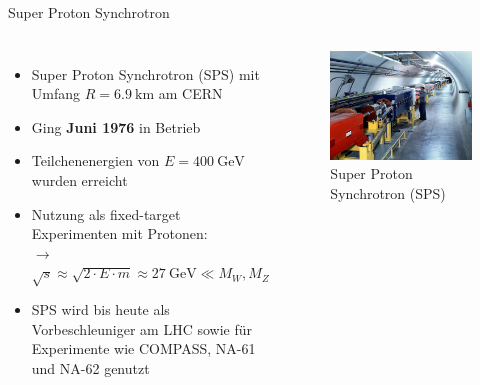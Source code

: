 \documentclass[aspectratio=1610, professionalfonts, 10pt]{beamer}
\begin{document}
\begin{frame}{Super Proton Synchrotron}
	\begin{columns}
				\begin{itemize}
					\setlength\itemsep{0.5em}
					\item Super Proton Synchrotron (SPS) mit Umfang $R = \SI{6.9}{\kilo\meter}$ am CERN
					\item Ging \textbf{Juni 1976} in Betrieb
					\item Teilchenenergien von $E = \SI{400}{\giga\electronvolt}$ wurden erreicht
					\item Nutzung als fixed-target Experimenten mit Protonen:\\
					$\rightarrow$ $\sqrt{s} \approx \sqrt{2 \cdot E \cdot m} \approx \SI{27}{\giga\electronvolt} \ll M_W, M_Z$ 
					\item SPS wird bis heute als Vorbeschleuniger am LHC sowie für Experimente wie COMPASS, NA-61 und NA-62 genutzt
				\end{itemize}

			\begin{figure}
	  			\centering
				\includegraphics[width=\linewidth]{Images/sps.jpg}
	  			\caption{Super Proton Synchrotron (SPS) \cite{sps}}
	  			\label{fig:sad}
			\end{figure}
	\end{columns}
\end{frame}
\end{document}
